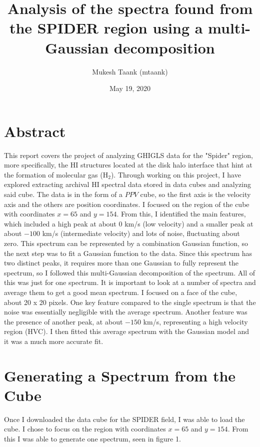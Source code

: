 \documentclass[12pt]{report}
\title{Analysis of the spectra found from the SPIDER region using a multi-Gaussian decomposition}
\author{Mukesh Taank (mtaank)}
\date{May 19, 2020}
\begin{document}
\maketitle


\section*{Abstract}
This report covers the project of analyzing GHIGLS data for the "Spider" region, more specifically, the HI structures located at the disk halo interface that hint at the formation of molecular gas (H$_{2}$).
Through working on this project, I have explored extracting  archival HI spectral data stored in data cubes and analyzing said cube.
The data is in the form of a $PPV$ cube, so the first axis is the velocity axis and the others are position coordinates. I focused on the region of the cube with coordinates $x = 65$ and $y = 154$.
From this, I identified the main features, which included a high peak at about $0$ km/s (low velocity) and a smaller peak at about $-100$ km/s (intermediate velocity) and lots of noise, fluctuating about zero.
This spectrum can be represented by a combination Gaussian function, so the next step was to fit a Gaussian function to the data.
Since this spectrum has two distinct peaks, it requires more than one Gaussian to fully represent the spectrum, so I followed this multi-Gaussian decomposition of the spectrum. 
All of this was just for one spectrum. It is important to look at a number of spectra and average them to get a good mean spectrum. 
I focused on a face of the cube, about 20 x 20 pixels. 
One key feature compared to the single spectrum is that the noise was essentially negligible with the average spectrum.
Another feature was the presence of another peak, at about $-150$ km/s, representing a high velocity region (HVC).
I then fitted this average spectrum with the Gaussian model and it was a much more accurate fit. 
\newpage


\section*{Generating a Spectrum from the Cube}
Once I downloaded the data cube for the SPIDER field, I was able to load the cube. I chose to focus on the region with coordinates $x = 65$ and $y = 154$.  From this I was able to generate one spectrum, seen in figure 1.
\end{document}
